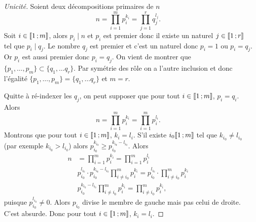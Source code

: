 \begin{proof}[Unicité]
  Soient deux décompositions primaires de \(n\)
  \begin{equation}
    n=\prod_{i=1}^m p_i^{k_i} = \prod_{j=1}^r q_j^{l_j}.
  \end{equation}
  Soit \(i \in \mathopen{\llbracket}1\mathclose{}\mathpunct{};m\mathclose{\rrbracket}\), alors \(p_i \mid n\) et \(p_i\) est
  premier donc il existe un naturel \(j \in \mathopen{\llbracket}1\mathclose{}\mathpunct{};r\mathclose{\rrbracket}\) tel que
  \(p_i \mid q_j\). Le nombre \(q_j\) est premier et c'est un naturel donc
  \(p_i=1\) ou \(p_i=q_j\). Or \(p_i\) est aussi premier donc \(p_i=q_j\). On
  vient de montrer que \(\{p_1, \ldots, p_m\} \subset \{q_1, \ldots q_r\}\). Par
  symétrie des rôle on a l'autre inclusion et donc l'égalité \(\{p_1, \ldots,
  p_m\} = \{q_1, \ldots q_r\}\) et \(m=r\).

  Quitte à ré-indexer les \(q_j\), on peut supposer que pour tout \(i \in
  \mathopen{\llbracket}1\mathclose{}\mathpunct{};m\mathclose{\rrbracket}\), \(p_i=q_i\). Alors
  \begin{equation}
    n=\prod_{i=1}^m p_i^{k_i} = \prod_{i=1}^m p_i^{l_i}.
  \end{equation}
  Montrons que pour tout \(i \in \mathopen{\llbracket}1\mathclose{}\mathpunct{};m\mathclose{\rrbracket}\), \(k_i=l_i\). S'il
  existe \(i_0 \mathopen{\llbracket}1\mathclose{}\mathpunct{};m\mathclose{\rrbracket}\) tel que \(k_{i_0} \neq l_{i_0}\) (par
  exemple \(k_{i_0} > l_{i_0}\)) alors \(p_{i_0}^{k_{i_0}} \geqslant
  p_{i_0}^{k_{i_0}-l_{i_0}}\). Alors
  \begin{align}
    n&=\prod_{i=1}^m p_i^{k_i} = \prod_{i=1}^m p_i^{l_i} \\
    &p_{i_0}^{l_{i_0}} \cdot p_{i_0}^{k_{i_0}-l_{i_0}} \prod_{i \neq i_0}^m
    p_i^{k_i} = p_{i_0}^{l_{i_0}} \cdot \prod_{i \neq i_0}^m p_i^{k_i}\\
    &p_{i_0}^{k_{i_0}-l_{i_0}} \prod_{i \neq i_0}^m p_i^{k_i} =\prod_{i \neq
    i_0}^m p_i^{k_i},
  \end{align}
  puisque \(p_{i_0}^{l_{i_0}} \neq 0\). Alors \(p_{i_0}\) divise le membre de
  gauche mais pas celui de droite. C'est absurde. Donc pour tout \(i \in
  \mathopen{\llbracket}1\mathclose{}\mathpunct{};m\mathclose{\rrbracket}\),  \(k_i=l_i\).
\end{proof}
